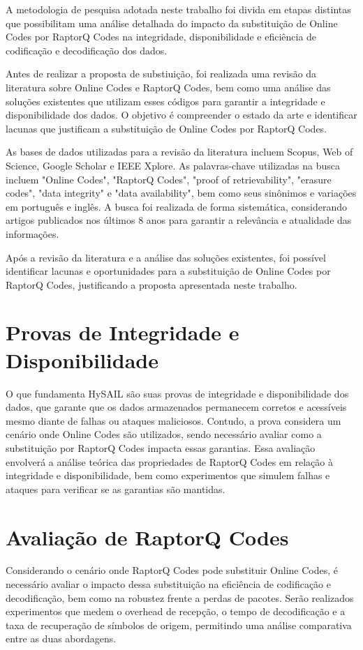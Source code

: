 A metodologia de pesquisa adotada neste trabalho foi divida em etapas distintas que possibilitam uma análise detalhada do impacto da substituição de Online Codes por RaptorQ Codes na integridade, disponibilidade e eficiência de codificação e decodificação dos dados.

Antes de realizar a proposta de substiuição, foi realizada uma revisão da literatura sobre Online Codes e RaptorQ Codes, bem como uma análise das soluções existentes que utilizam esses códigos para garantir a integridade e disponibilidade dos dados. O objetivo é compreender o estado da arte e identificar lacunas que justificam a substituição de Online Codes por RaptorQ Codes.

As bases de dados utilizadas para a revisão da literatura incluem Scopus, Web of Science, Google Scholar e IEEE Xplore. As palavras-chave utilizadas na busca incluem "Online Codes", "RaptorQ Codes", "proof of retrievability", "erasure codes", "data integrity" e "data availability", bem como seus sinônimos e variações em português e inglês. A busca foi realizada de forma sistemática, considerando artigos publicados nos últimos 8 anos para garantir a relevância e atualidade das informações.

Após a revisão da literatura e a análise das soluções existentes, foi possível identificar lacunas e oportunidades para a substituição de Online Codes por RaptorQ Codes, justificando a proposta apresentada neste trabalho.

\section{Provas de Integridade e Disponibilidade}
O que fundamenta HySAIL são suas provas de integridade e disponibilidade dos dados, que garante que os dados armazenados permanecem corretos e acessíveis mesmo diante de falhas ou ataques maliciosos. Contudo, a prova considera um cenário onde Online Codes são utilizados, sendo necessário avaliar como a substituição por RaptorQ Codes impacta essas garantias. Essa avaliação envolverá a análise teórica das propriedades de RaptorQ Codes em relação à integridade e disponibilidade, bem como experimentos que simulem falhas e ataques para verificar se as garantias são mantidas.

\section{Avaliação de RaptorQ Codes}
Considerando o cenário onde RaptorQ Codes pode substituir Online Codes, é necessário avaliar o impacto dessa substituição na eficiência de codificação e decodificação, bem como na robustez frente a perdas de pacotes. Serão realizados experimentos que medem o overhead de recepção, o tempo de decodificação e a taxa de recuperação de símbolos de origem, permitindo uma análise comparativa entre as duas abordagens.
